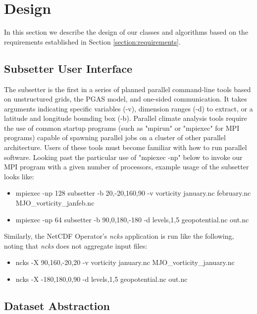 \section{Design}
\label{section:design}

In this section we describe the design of our classes and algorithms based on
the requirements established in Section \ref{section:requirements}.

\subsection{Subsetter User Interface}

The subsetter is the first in a series of planned parallel command-line tools
based on unstructured grids, the PGAS model, and one-sided communication.  It
takes arguments indicating specific variables (-v), dimension ranges (-d) to
extract, or a latitude and longitude bounding box (-b).  Parallel climate
analysis tools require the use of common startup programs (such as
"mpirun" or "mpiexec" for MPI programs) capable of spawning parallel jobs on a
cluster of other parallel architecture.  Users of these tools must become
familiar with how to run parallel software.  Looking past the particular use
of "mpiexec -np" below to invoke our MPI program with a given number of
processors, example usage of the subsetter looks like:

\begin{itemize}
\item mpiexec -np 128 subsetter -b 20,-20,160,90 -v vorticity january.nc february.nc MJO\_vorticity\_janfeb.nc
\item mpiexec -np 64 subsetter -b 90,0,180,-180 -d levels,1,5 geopotential.nc out.nc
\end{itemize}

Similarly, the NetCDF Operator's \emph{ncks} application\cite{NCO} is run
like the following, noting that \emph{ncks} does not aggregate input files:

\begin{itemize}
\item ncks -X 90,160,-20,20 -v vorticity january.nc MJO\_vorticity\_january.nc
\item ncks -X -180,180,0,90 -d levels,1,5 geopotential.nc out.nc
\end{itemize}

\subsection{Dataset Abstraction}

